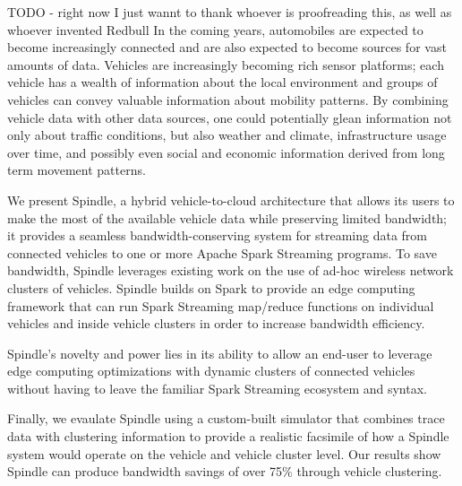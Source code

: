 \documentclass{thesis}
\author{William Rory Kronmiller}
\begin{document}
 
\titlepage             %
\tableofcontents       %
\listoftables          %
\listoffigures         %

   TODO - right now I just wannt to thank whoever is proofreading this, as well as whoever invented Redbull 
    In the coming years, automobiles are expected to become increasingly connected and are
    also expected to become sources for vast amounts of data. Vehicles are increasingly 
    becoming rich sensor platforms; each vehicle has a wealth of information about the local
    environment and groups of vehicles can convey valuable information about mobility patterns.
    By combining vehicle data with other data sources, one could potentially glean information
    not only about traffic conditions, but also weather and climate, infrastructure usage over
    time, and possibly even social and economic information derived from long term movement
    patterns.
    
    We present Spindle, a hybrid vehicle-to-cloud architecture that allows its users to make
    the most of the available vehicle data while preserving limited bandwidth; it provides a 
    seamless bandwidth-conserving system for streaming data from connected vehicles to one 
    or more Apache Spark Streaming programs. To save bandwidth, Spindle leverages existing 
    work on the use of ad-hoc wireless network clusters of vehicles. Spindle builds on Spark
    to provide an edge computing framework that can run Spark Streaming  map/reduce functions on
    individual vehicles and inside vehicle clusters in order to increase bandwidth efficiency.

    Spindle's novelty and power lies in its ability to allow an end-user to leverage edge
    computing optimizations with dynamic clusters of connected vehicles without having to
    leave the familiar Spark Streaming ecosystem and syntax.

    Finally, we evaulate Spindle using a custom-built simulator that combines trace data
    with clustering information to provide a realistic facsimile of how a Spindle system
    would operate on the vehicle and vehicle cluster level. Our results show Spindle can
    produce bandwidth savings of over 75\% through vehicle clustering. %
\end{document}

